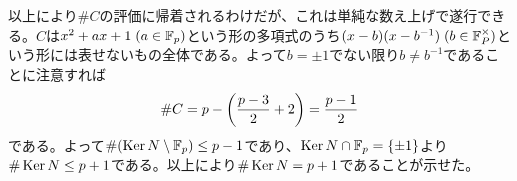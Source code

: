 \begin{sol}
\begin{description}
    以上により$\# C$の評価に帰着されるわけだが、これは単純な数え上げで遂行できる。$C$は$x^2 + ax + 1 \; ( a \in {\mathbb F}_p)$という形の多項式のうち$(x - b)(x - b^{-1}) \; ( b \in {\mathbb F}_P^{\times})$という形には表せないもの全体である。よって$b= \pm 1$でない限り$b \neq b^{-1}$であることに注意すれば
    \[
    \# C = p - \left( \frac{p-3}{2} + 2 \right) = \frac{p-1}{2}
    \]
    である。よって$\# ( \operatorname{Ker} N \setminus {\mathbb F}_p) \leq p-1$であり、$\operatorname{Ker} N \cap {\mathbb F}_p = \{ \pm 1 \}$より$\# \operatorname{Ker} N \leq p+1$である。以上により$\# \operatorname{Ker} N = p+1$であることが示せた。
  \end{description}
\end{sol}
